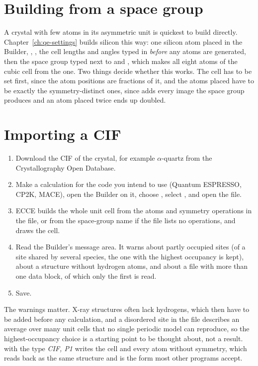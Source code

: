 \section{Building from a space group}
A crystal with few atoms in its asymmetric unit is quickest to build directly. Chapter~\ref{ch:qe-settings} builds silicon this way: one silicon atom placed in the Builder, , , the cell lengths and angles typed in \emph{before} any atoms are generated, then the space group typed next to  and , which makes all eight atoms of the cubic cell from the one. Two things decide whether this works. The cell has to be set first, since the atom positions are fractions of it, and the atoms placed have to be exactly the symmetry-distinct ones, since  adds every image the space group produces and an atom placed twice ends up doubled.

\section{Importing a CIF}
\begin{enumerate}
	\item Download the CIF of the crystal, for example $\alpha$-quartz from the Crystallography Open Database.
	\item Make a calculation for the code you intend to use (Quantum ESPRESSO, CP2K, MACE), open the Builder on it, choose , select , and open the file.
	\item ECCE builds the whole unit cell from the atoms and symmetry operations in the file, or from the space-group name if the file lists no operations, and draws the cell.
	\item Read the Builder's message area. It warns about partly occupied sites (of a site shared by several species, the one with the highest occupancy is kept), about a structure without hydrogen atoms, and about a file with more than one data block, of which only the first is read.
	\item Save.
\end{enumerate}

The warnings matter. X-ray structures often lack hydrogens, which then have to be added before any calculation, and a disordered site in the file describes an average over many unit cells that no single periodic model can reproduce, so the highest-occupancy choice is a starting point to be thought about, not a result.  with the type \emph{CIF, P1} writes the cell and every atom without symmetry, which reads back as the same structure and is the form most other programs accept.

